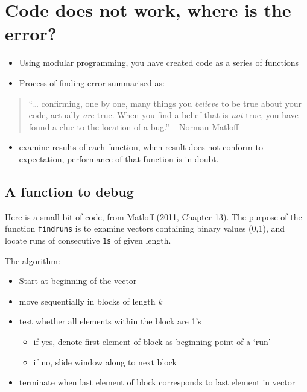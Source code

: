 \documentclass[]{article}
\providecommand{\tightlist}{%
  \setlength{\itemsep}{0pt}\setlength{\parskip}{0pt}}
\begin{document}
\section{Code does not work, where is the
error?}\label{code-does-not-work-where-is-the-error}

\begin{itemize}
\tightlist
\item
  Using modular programming, you have created code as a series of
  functions
\item
  Process of finding error summarised as:
\end{itemize}

\begin{quote}
``\ldots{} confirming, one by one, many things you \emph{believe} to be
true about your code, actually \emph{are} true. When you find a belief
that is \emph{not} true, you have found a clue to the location of a
bug.'' -- Norman Matloff
\end{quote}

\begin{itemize}
\tightlist
\item
  examine results of each function, when result does not conform to
  expectation, performance of that function is in doubt.
\end{itemize}

\subsection{A function to debug}\label{a-function-to-debug}

Here is a small bit of code, from
\href{http://library.st-andrews.ac.uk/search~S5?/amatloff\&keyword-selector=author/amatloff/1\%2C4\%2C7\%2CB/frameset\&FF=amatloff+norman+s+author\&1\%2C1\%2C}{Matloff
(2011, Chapter 13)}. The purpose of the function \texttt{findruns} is to
examine vectors containing binary values (0,1), and locate runs of
consecutive \texttt{1s} of given length.

The algorithm:

\begin{itemize}
\tightlist
\item
  Start at beginning of the vector
\item
  move sequentially in blocks of length \emph{k}
\item
  test whether all elements within the block are 1's

  \begin{itemize}
  \tightlist
  \item
    if yes, denote first element of block as beginning point of a `run'
  \item
    if no, slide window along to next block
  \end{itemize}
\item
  terminate when last element of block corresponds to last element in
  vector
\end{itemize}
\end{document}
